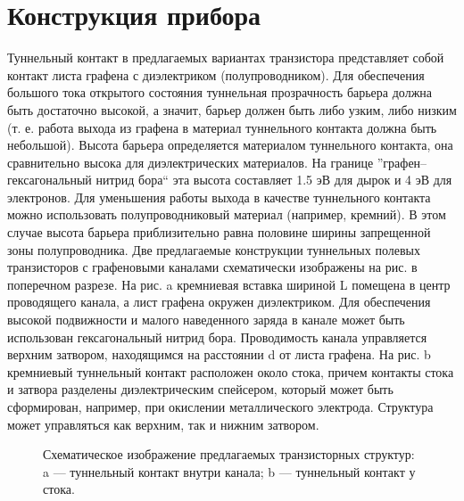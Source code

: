 \documentclass[a4paper,12pt]{article} %
\begin{document}
\section{Конструкция прибора}
\noindent Туннельный контакт в предлагаемых вариантах транзистора представляет собой контакт листа графена с диэлектриком (полупроводником). Для обеспечения большого тока открытого состояния туннельная прозрачность барьера должна быть достаточно высокой, а значит, барьер должен быть либо узким, либо низким (т. е. работа выхода из графена в материал туннельного контакта должна быть небольшой). Высота барьера определяется материалом туннельного контакта, она сравнительно высока для диэлектрических материалов. На границе ”графен–гексагональный нитрид бора“ эта высота составляет 1.5 эВ для дырок и 4 эВ для электронов. Для уменьшения работы выхода в качестве туннельного контакта можно использовать полупроводниковый материал (например, кремний). В этом случае высота барьера приблизительно равна половине ширины запрещенной зоны полупроводника. Две предлагаемые конструкции туннельных полевых транзисторов с графеновыми каналами схематически изображены на рис. в поперечном разрезе. На рис. a кремниевая вставка шириной L помещена в центр проводящего канала, а лист графена окружен диэлектриком. Для обеспечения высокой подвижности и малого наведенного заряда в канале может быть использован гексагональный нитрид бора. Проводимость канала управляется верхним затвором, находящимся на расстоянии d от листа графена. На рис. b кремниевый туннельный контакт расположен около стока, причем контакты стока и затвора разделены диэлектрическим спейсером, который может быть сформирован, например, при окислении металлического электрода. Структура может управляться как верхним, так и нижним затвором.
\begin{figure}[h!]
\caption{ Схематическое изображение предлагаемых транзисторных структур: a — туннельный контакт внутри канала; b — туннельный контакт у стока.}
\end{figure}
\end{document}
